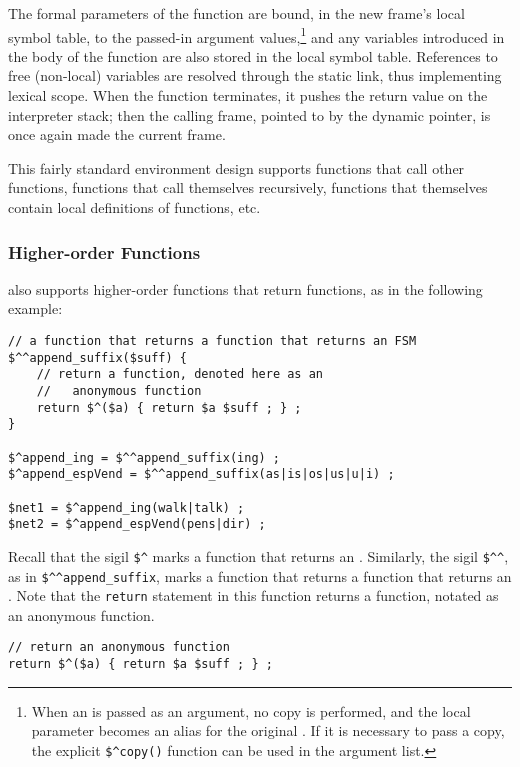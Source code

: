 The formal parameters of the function are bound, in the new frame's local
symbol table, to the passed-in argument values,\footnote{When an \fsm{} is passed as an argument, no copy is performed, and the local
parameter becomes an alias for the original \fsm{}.  If it is
necessary to pass a copy, the explicit \verb!$^copy()! function can be used
in the argument list.}  and any variables introduced in
the body of the function are also stored in the local symbol
table.  References to free (non-local) variables are resolved
through the static link, thus implementing lexical scope.  When the
function terminates, it pushes the return value on the interpreter stack; then
the calling frame, pointed to by the dynamic
pointer, is once again made the current frame.

This fairly standard environment design supports functions that call other
functions, functions that call themselves recursively, functions
that themselves contain local definitions of functions, etc.  

\subsubsection{Higher-order Functions}

\Kleene{} also supports higher-order functions that return functions,
as in the following example:

\begin{Verbatim}
// a function that returns a function that returns an FSM 
$^^append_suffix($suff) {
    // return a function, denoted here as an
    //   anonymous function
    return $^($a) { return $a $suff ; } ;
}

$^append_ing = $^^append_suffix(ing) ;
$^append_espVend = $^^append_suffix(as|is|os|us|u|i) ;

$net1 = $^append_ing(walk|talk) ;
$net2 = $^append_espVend(pens|dir) ;
\end{Verbatim}

\noindent
Recall that the sigil \verb!$^! marks a function that returns an \fsm{}. Similarly,
the sigil \verb!$^^!, as in \verb!$^^append_suffix!, marks a function that returns a function that returns an
\fsm{}.  Note that the \texttt{return} statement in this function returns a function, notated as an anonymous
function.

\begin{Verbatim}
// return an anonymous function
return $^($a) { return $a $suff ; } ;
\end{Verbatim}

